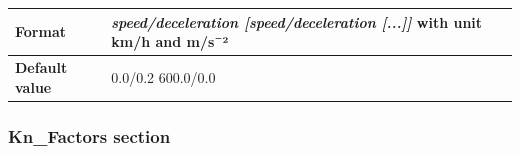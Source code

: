 \begin{itemize}
\begin{longtable}{|l|l|}
		\hline
		
		\begin{minipage}[t]{0.22\linewidth} \textbf{Format}	\end{minipage}
		&	\begin{minipage}[t]{0.78\linewidth} \textit{speed/deceleration [speed/deceleration [...]]}  with unit km/h and m/s¯²\end{minipage} \\
		
		\hline
		
		\begin{minipage}[t]{0.22\linewidth} \textbf{Default value}	\end{minipage}
		&	\begin{minipage}[t]{0.78\linewidth} 0.0/0.2 600.0/0.0 \end{minipage} \\
		
		\hline
	\end{longtable}	
	
\end{itemize}
	
\subsubsection{Kn\_Factors section}

